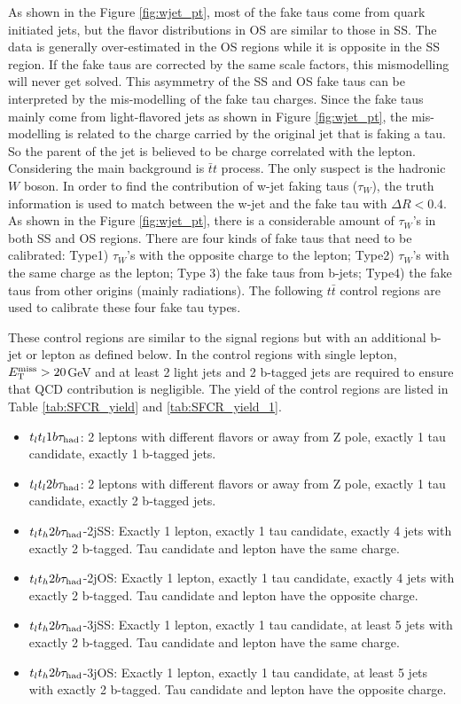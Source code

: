 As shown in the Figure \ref{fig:wjet_pt}, most of the fake taus come from quark initiated jets, but the flavor distributions in OS are similar to those in SS. The data is generally over-estimated in the OS regions while it is opposite in the SS region. If the fake taus are corrected by the same scale factors, this mismodelling will never get solved. This asymmetry of the SS and OS fake taus can be interpreted by the mis-modelling of the fake tau charges. Since the fake taus mainly come from light-flavored jets as shown in Figure \ref{fig:wjet_pt}, the mis-modelling is related to the charge carried by the original jet that is faking a tau.
So the parent of the jet is believed to be charge correlated with the lepton. Considering the main background is $\bar{t}t$ process. The only suspect is the hadronic $W$ boson. In order to find the contribution of w-jet faking taus ($\tau_{W}$), the truth information is used to match between the w-jet and the fake tau with $\Delta R < 0.4$. As shown in the Figure \ref{fig:wjet_pt}, there is a considerable amount of $\tau_{W}$'s in both SS and OS regions. There are four kinds of fake taus that need to be calibrated: Type1) $\tau_{W}$'s with the opposite charge to the lepton; Type2) $\tau_{W}$'s with the same charge as the lepton; Type 3) the fake taus from b-jets; Type4) the fake taus from other origins (mainly radiations). The following
$t\bar t$ control regions are used to calibrate these four fake tau types.

These control regions are similar to the signal regions but with an additional b-jet or lepton as defined below. In the control regions with single lepton, $E_{\text{T}}^{\text{miss}} > 20$GeV and at least 2 light jets and 2 b-tagged jets are required to ensure that QCD contribution is negligible. The yield of the control regions are listed in Table \ref{tab:SFCR_yield} and \ref{tab:SFCR_yield_1}.

\begin{itemize}
\item{$t_lt_l1b\tau_\text{had}$: 2 leptons with different flavors or away from Z pole, exactly 1 tau candidate,  exactly 1 b-tagged jets.}
\item{$t_lt_l2b\tau_\text{had}$: 2 leptons with different flavors or away from Z pole, exactly 1 tau candidate,  exactly 2 b-tagged jets.}
\item{$t_lt_h2b\tau_\text{had}$-2jSS: Exactly 1 lepton, exactly 1 tau candidate, exactly 4 jets with exactly 2 b-tagged. Tau candidate and lepton have the same charge.}
\item{$t_lt_h2b\tau_\text{had}$-2jOS: Exactly 1 lepton, exactly 1 tau candidate, exactly 4 jets with exactly 2 b-tagged. Tau candidate and lepton have the opposite charge.}
\item{$t_lt_h2b\tau_\text{had}$-3jSS: Exactly 1 lepton, exactly 1 tau candidate, at least 5 jets with exactly 2 b-tagged. Tau candidate and lepton have the same charge.}
\item{$t_lt_h2b\tau_\text{had}$-3jOS: Exactly 1 lepton, exactly 1 tau candidate, at least 5 jets with exactly 2 b-tagged. Tau candidate and lepton have the opposite charge.}
\end{itemize}


